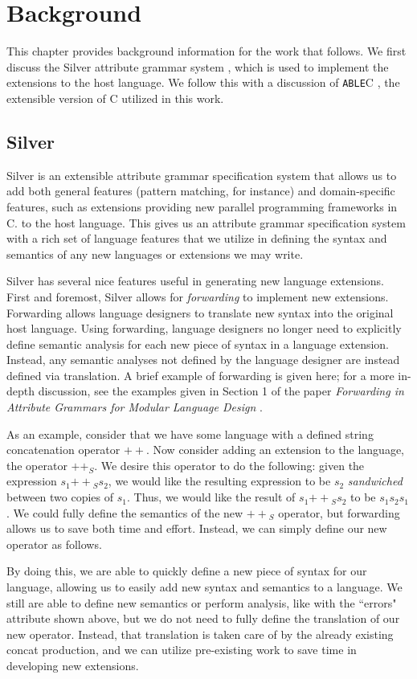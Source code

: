 \documentclass[main.tex]{subfiles}
\begin{document}
\section{Background}

This chapter provides background information for the work that follows. 
We first discuss the Silver attribute grammar system 
\cite{3}, which is used to implement the extensions to the host language.
We follow this with a discussion of \verb|ABLE|C \cite{10}, the extensible
version of C utilized in this work.

\subsection{Silver} %
Silver \cite{3} is an extensible attribute grammar specification system that allows us to 
add both general features (pattern matching, for instance) and domain-specific features,
such as extensions providing new parallel programming frameworks in C.
to the host language. This gives us an attribute grammar specification system with a rich
set of language features that we utilize in defining the syntax and semantics of any new 
languages or extensions we may write.

Silver has several nice features useful in generating new language extensions.
First and foremost, Silver allows for \emph{forwarding} \cite{4} to 
implement new extensions. Forwarding allows language
designers to translate new syntax into the original host language. Using forwarding,
language designers no longer need to explicitly define semantic analysis for each new
piece of syntax in a language extension. Instead, any semantic analyses not defined
by the language designer are instead defined via translation. A brief example of forwarding is 
given here; for a more in-depth discussion, see the examples given in Section 1 of the paper 
\emph{Forwarding in Attribute Grammars for Modular Language Design} \cite{4}.

As an example, consider that we have some language with a defined string concatenation operator $++$.
Now consider adding an extension to the language, the operator $++_S$. We desire this operator to do
the following: given the expression $s_1 {++}_S s_2$, we would like the resulting expression to be $s_2$
\emph{sandwiched} between two copies of $s_1$. Thus, we would like the result of $s_1 {++}_S s_2$ to be $s_1 s_2 s_1$.
We could fully define the semantics of the new ${++}_S$ operator, but forwarding allows us to save both time and
effort. Instead, we can simply define our new operator as follows.

By doing this, we are able to quickly define a new piece of syntax for our language, allowing us to easily add new
syntax and semantics to a language. We still are able to define new semantics or perform analysis, like with the
``errors" attribute shown above, but we do not need to fully define the translation of our new operator. Instead,
that translation is taken care of by the already existing concat production, and we can utilize pre-existing work
to save time in developing new extensions.
\end{document}
